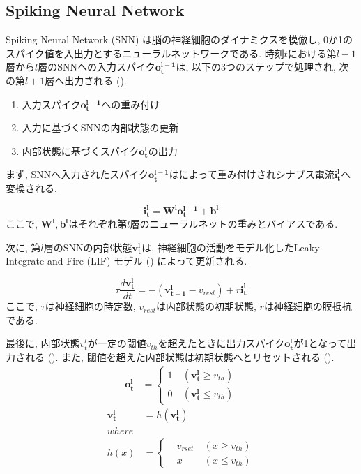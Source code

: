 \makeatletter %
\subsection{Spiking Neural Network}
Spiking Neural Network (SNN) は脳の神経細胞のダイナミクスを模倣し, 0か1のスパイク値を入出力とするニューラルネットワークである.
時刻$t$における第$l-1$層から$l$層のSNNへの入力スパイク$\bm{o_t^{l-1}}$は, 以下の3つのステップで処理され, 次の第$l+1$層へ出力される ().

\begin{enumerate}
    \item 入力スパイク$\bm{o_t^{l-1}}$への重み付け
    \item 入力に基づくSNNの内部状態の更新
    \item 内部状態に基づくスパイク$\bm{o_t^l}$の出力
\end{enumerate}


まず, SNNへ入力されたスパイク$\bm{o_t^{l-1}}$はによって重み付けされシナプス電流$\bm{i_t^l}$へ変換される.

\begin{equation}
    \bm{i_t^l} = \bm{W^l}\bm{o_t^{l-1}} + \bm{b^l}
    \label{eq:input_spike}
\end{equation}
ここで, $\bm{W^l}, \bm{b^l}$はそれぞれ第$l$層のニューラルネットの重みとバイアスである.

次に, 第$l$層のSNNの内部状態$\bm{v_t^l}$は, 神経細胞の活動をモデル化したLeaky Integrate-and-Fire (LIF) モデル () によって更新される.

\begin{equation}
    {\tau}\frac{d\bm{v_t^l}}{dt}=-(\bm{v_{t-1}^l}-v_{rest})+r\bm{i_t^l}
    \label{eq:lif}
\end{equation}
ここで, $\tau$は神経細胞の時定数, $v_{rest}$は内部状態の初期状態, $r$は神経細胞の膜抵抗である.

最後に, 内部状態$v_t^l$が一定の閾値$v_{th}$を超えたときに出力スパイク$\bm{o_t^l}$が1となって出力される ().
また, 閾値を超えた内部状態は初期状態へとリセットされる ().
\begin{equation}
    \begin{split}
      \bm{o_t^{l}}&=\left\{
        \begin{alignedat}{2}
          1 &\:(\bm{v_t^l}{\geq}v_{th})\\
          0 &\:(\bm{v_t^l}{\leq}v_{th})
        \end{alignedat}
      \right. 
    \end{split} \label{eq:outputSpike}
  \end{equation}
  \begin{equation}
    \begin{split}
      \bm{v_t^l}&=h(\bm{v_t^l})\\
    where\\
    h(x)&=\left\{
      \begin{alignedat}{2}
        &v_{rset} &\:(x{\geq}v_{th})\\
        &x &\:(x{\leq}v_{th})
      \end{alignedat}
    \right. 
    \end{split} \label{eq:outputSpike2}
  \end{equation}
